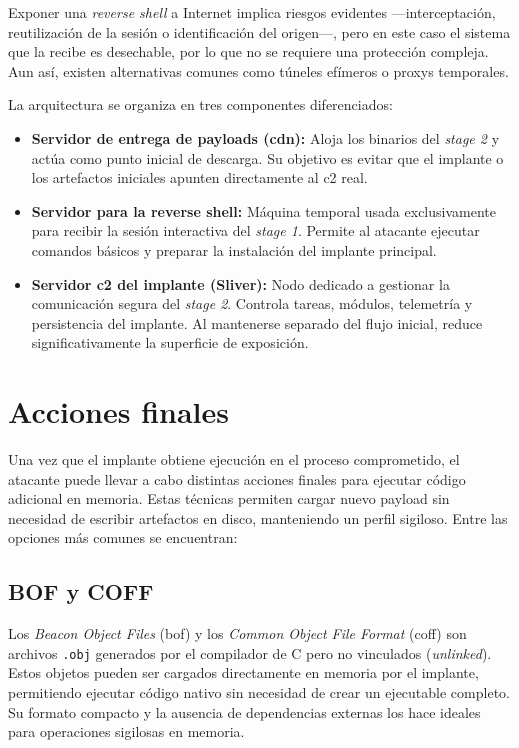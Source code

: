 Exponer una \textit{reverse shell} a Internet implica riesgos evidentes —interceptación, reutilización de la sesión o identificación del origen—, pero en este caso el sistema que la recibe es desechable, por lo que no se requiere una protección compleja. Aun así, existen alternativas comunes como túneles efímeros o proxys temporales.

La arquitectura se organiza en tres componentes diferenciados:

\begin{itemize}
    \item \textbf{Servidor de entrega de payloads (\acrshort{cdn}):} Aloja los binarios del \textit{stage 2} y actúa como punto inicial de descarga. Su objetivo es evitar que el implante o los artefactos iniciales apunten directamente al \acrshort{c2} real.
    \item \textbf{Servidor para la reverse shell:} Máquina temporal usada exclusivamente para recibir la sesión interactiva del \textit{stage 1}. Permite al atacante ejecutar comandos básicos y preparar la instalación del implante principal.
    \item \textbf{Servidor \acrshort{c2} del implante (Sliver):} Nodo dedicado a gestionar la comunicación segura del \textit{stage 2}. Controla tareas, módulos, telemetría y persistencia del implante. Al mantenerse separado del flujo inicial, reduce significativamente la superficie de exposición.
\end{itemize}

\section{Acciones finales} \label{sec:acciones-finales}
\label{sec:ejecutar-desde-implante}

Una vez que el implante obtiene ejecución en el proceso comprometido, el atacante puede llevar a cabo distintas acciones finales para ejecutar código adicional en memoria. Estas técnicas permiten cargar nuevo payload sin necesidad de escribir artefactos en disco, manteniendo un perfil sigiloso. Entre las opciones más comunes se encuentran:

\subsection{BOF y COFF}
Los \textit{Beacon Object Files} (\acrshort{bof}) y los \textit{Common Object File Format} (\acrshort{coff}) son archivos \texttt{.obj} generados por el compilador de C pero no vinculados (\textit{unlinked}).  
Estos objetos pueden ser cargados directamente en memoria por el implante, permitiendo ejecutar código nativo sin necesidad de crear un ejecutable completo.  
Su formato compacto y la ausencia de dependencias externas los hace ideales para operaciones sigilosas en memoria.


